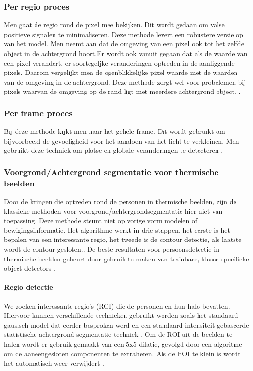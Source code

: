 \subsubsection{Per regio proces}
\label{refPRP}
Men gaat de regio rond de pixel mee bekijken. Dit wordt gedaan om valse positieve signalen te minimaliseren. Deze methode levert een robustere versie op van het model. Men neemt aan dat de omgeving van een pixel ook tot het zelfde object in de achtergrond hoort.Er wordt ook vanuit gegaan dat als de waarde van een pixel verandert, er soortegeljke veranderingen optreden in de aanliggende pixels. Daarom vergelijkt men de ogenblikkelijke pixel waarde met de waarden van de omgeving in de achtergrond. Deze methode zorgt wel voor probelemen bij pixels waarvan de omgeving op de rand ligt met meerdere achtergrond object.  \cite{bibBET8}.

\subsubsection{Per frame proces}
\label{refPFP}
Bij deze methode kijkt men naar het gehele frame. Dit wordt gebruikt om bijvoorbeeld de gevoeligheid voor het aandoen van het licht te verkleinen. Men gebruikt deze techniek om plotse en globale veranderingen te detecteren \cite{bibBET8}.

\subsubsection{Voorgrond/Achtergrond segmentatie voor thermische beelden}
\label{refBETB}
Door de kringen die optreden rond de personen in thermische beelden, zijn de klassieke methoden voor voorgrond/achtergrondsegmentatie hier niet van toepassing. Deze methode steunt niet op vorige vorm modelen of bewigingsinformatie. Het algorithme werkt in drie stappen, het eerste is het bepalen van een interessante regio, het tweede is de contour detectie, als laatste wordt de contour gesloten.\cite{bibBET5}. De beste resultaten voor persoonsdetectie in thermische beelden gebeurt door gebruik te maken van trainbare, klasse specifieke object detectors \cite{bibBET7}.

\paragraph{Regio detectie}
We zoeken interessante regio's (ROI) die de personen en hun halo bevatten. Hiervoor kunnen verschillende technieken gebruikt worden zoals  het standaard gausisch model dat eerder besproken werd en een standaard intensiteit gebaseerde statistische achtergrond segmentatie techniek \cite{bibBET6}. Om de ROI uit de beelden te halen wordt er gebruik gemaakt van een 5x5 dilatie, gevolgd door een algoritme om de aaneengesloten componenten te extraheren. Als de ROI te klein is wordt het automatisch weer verwijdert \cite{bibBET5}. 

